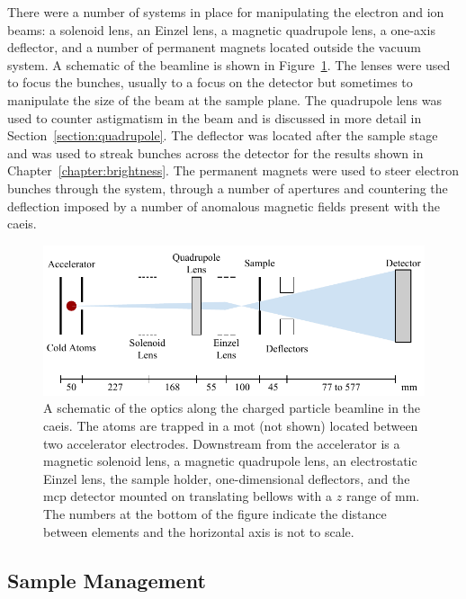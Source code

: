 There were a number of systems in place for manipulating the electron and ion beams: a solenoid lens, an Einzel lens, a magnetic quadrupole lens, a one-axis deflector, and a number of permanent magnets located outside the vacuum system.
A schematic of the beamline is shown in Figure~\ref{figure:full_beam_apparatus}.
The lenses were used to focus the bunches, usually to a focus on the detector but sometimes to manipulate the size of the beam at the sample plane.
The quadrupole lens was used to counter astigmatism in the beam and is discussed in more detail in Section~\ref{section:quadrupole}.
The deflector was located after the sample stage and was used to streak bunches across the detector for the results shown in Chapter~\ref{chapter:brightness}.
The permanent magnets were used to steer electron bunches through the system, through a number of apertures and countering the deflection imposed by a number of anomalous magnetic fields present with the \gls{caeis}.

\begin{figure}
    \center
    \includegraphics{part2/Figs/FullApparatusSchematic.pdf}
    \caption[Beam optics schematic.]{A schematic of the optics along the charged particle beamline in the \gls{caeis}. The atoms are trapped in a \gls{mot} (not shown) located between two accelerator electrodes. Downstream from the accelerator is a magnetic solenoid lens, a magnetic quadrupole lens, an electrostatic Einzel lens, the sample holder, one-dimensional deflectors, and the \gls{mcp} detector mounted on translating bellows with a $z$ range of \unit[500]{mm}. The numbers at the bottom of the figure indicate the distance between elements and the horizontal axis is not to scale.}
    \label{figure:full_beam_apparatus}
\end{figure}

\subsection{Sample Management}

